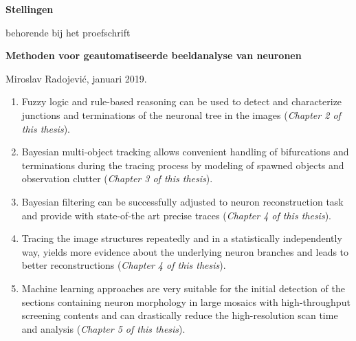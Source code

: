 \documentclass[10pt]{report}%
\begin{document}
\pagestyle{empty}
\setlength{\leftmargini}{0em}

\begin{center}
  {\Large\bf Stellingen}

  \medskip

  behorende bij het proefschrift

  \medskip

  {\large\bf  Methoden voor geautomatiseerde beeldanalyse van neuronen}

  \medskip

  Miroslav Radojevi\'{c}, januari 2019.
\end{center}

\bigskip
\small

\begin{enumerate}
  
\item Fuzzy logic and rule-based reasoning can be used to detect and characterize junctions and terminations of the neuronal tree in the images (\emph{Chapter 2 of this thesis}). 

\medskip
  
\item Bayesian multi-object tracking allows convenient handling of bifurcations and terminations during the tracing process by modeling of spawned objects and observation clutter (\emph{Chapter 3 of this thesis}).  
  
\medskip

\item Bayesian filtering can be successfully adjusted to neuron reconstruction task and provide with state-of-the art precise traces (\emph{Chapter 4 of this thesis}).
	
\medskip

\item Tracing the image structures repeatedly and in a statistically independently way, yields more evidence about the underlying neuron branches and leads to better reconstructions (\emph{Chapter 4 of this thesis}).

\medskip

\item Machine learning approaches are very suitable for the initial detection of the sections containing neuron morphology in large mosaics with high-throughput screening contents and can drastically reduce the high-resolution scan time and analysis (\emph{Chapter 5 of this thesis}).


\end{enumerate}
\end{document}
